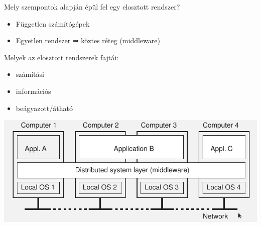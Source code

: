 \documentclass[12pt]{article}
\begin{document}
\begin{description}
                                                                    \item  Mely szempontok alapján épül fel egy elosztott rendszer?
                                                                        \begin{itemize}
                                                                            \item Független számítógépek
                                                                            \item Egyetlen rendszer ⇒ köztes réteg (middleware)
                                                                        \end{itemize}
                                                                    \item
                                                                        Melyek az elosztott rendszerek fajtái:
                                                                        \begin{itemize}
                                                                            \item
                                                                                számítási
                                                                            \item
                                                                                információs
                                                                            \item
                                                                                beágyazott/átható
                                                                        \end{itemize}
                                                                        \begin{center}
                                                                        \includegraphics[scale=0.5]{images/ElosztottRendszer.png}
                                                                    \end{center}
                                                                \end{description}
\end{document}
